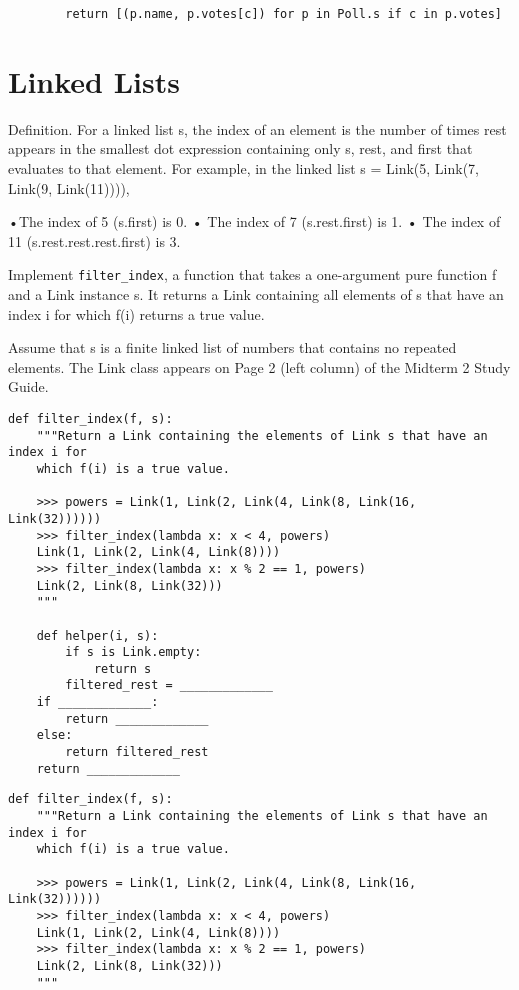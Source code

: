 \documentclass{exam}
\begin{document}
\begin{questions}
\begin{solution}
\begin{lstlisting}
		return [(p.name, p.votes[c]) for p in Poll.s if c in p.votes]
\end{lstlisting}
\end{solution}
\section{Linked Lists}

\begin{blocksection}
	Definition. For a linked list s, the index of an element is the number of times rest appears in the smallest
	dot expression containing only s, rest, and first that evaluates to that element. For example, in the
	linked list s = Link(5, Link(7, Link(9, Link(11)))),
	
	•The index of 5 (s.first) is 0.
	• The index of 7 (s.rest.first) is 1.
	• The index of 11 (s.rest.rest.rest.first) is 3.
	
	Implement \lstinline{filter_index}, a function that takes a one-argument pure function f and a Link instance s. It
	returns a Link containing all elements of s that have an index i for which f(i) returns a true value.
	
	Assume that s is a finite linked list of numbers that contains no repeated elements. The Link class appears
	on Page 2 (left column) of the Midterm 2 Study Guide.
\begin{lstlisting}
def filter_index(f, s):
	"""Return a Link containing the elements of Link s that have an index i for
	which f(i) is a true value.
	
	>>> powers = Link(1, Link(2, Link(4, Link(8, Link(16, Link(32))))))
	>>> filter_index(lambda x: x < 4, powers)
	Link(1, Link(2, Link(4, Link(8))))
	>>> filter_index(lambda x: x % 2 == 1, powers)
	Link(2, Link(8, Link(32)))
	"""
	
	def helper(i, s):
		if s is Link.empty:
			return s
		filtered_rest = _____________
	if _____________:
		return _____________
	else:
		return filtered_rest
	return _____________
\end{lstlisting}
\end{blocksection}
\begin{solution}
\begin{lstlisting}
def filter_index(f, s):
	"""Return a Link containing the elements of Link s that have an index i for
	which f(i) is a true value.
	
	>>> powers = Link(1, Link(2, Link(4, Link(8, Link(16, Link(32))))))
	>>> filter_index(lambda x: x < 4, powers)
	Link(1, Link(2, Link(4, Link(8))))
	>>> filter_index(lambda x: x % 2 == 1, powers)
	Link(2, Link(8, Link(32)))
	"""
	

\end{lstlisting}
\end{solution}
\end{questions}
\end{document}
